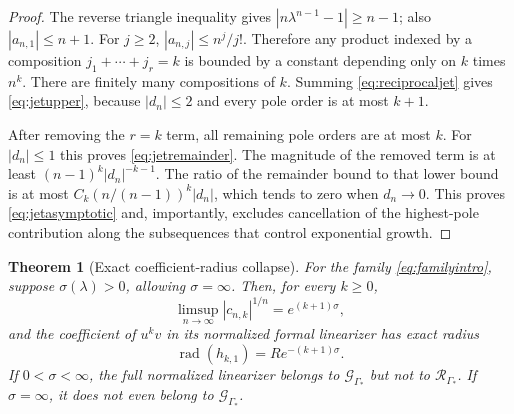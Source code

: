\documentclass[11pt,a4paper]{article}
\numberwithin{equation}{section}
\newtheorem{theorem}{Theorem}[section]
\theoremstyle{definition}
\theoremstyle{remark}
\newcommand{\GG}{\mathcal G}
\newcommand{\RR}{\mathcal R}
\newcommand{\rad}{\operatorname{rad}}
\newcommand{\Gstar}{\Gamma_*}
\begin{document}
\begin{proof}
The reverse triangle inequality gives
$|n\lambda^{n-1}-1|\ge n-1$; also $|a_{n,1}|\le n+1$.
For $j\ge2$, $|a_{n,j}|\le n^j/j!$. Therefore any product indexed by a
composition $j_1+\cdots+j_r=k$ is bounded by a constant depending only
on $k$ times $n^k$. There are finitely many compositions of $k$.
Summing \eqref{eq:reciprocaljet} gives \eqref{eq:jetupper}, because
$|d_n|\le2$ and every pole order is at most $k+1$.

After removing the $r=k$ term, all remaining pole orders are at most $k$.
For $|d_n|\le1$ this proves \eqref{eq:jetremainder}. The magnitude of
the removed term is at least $(n-1)^k|d_n|^{-k-1}$. The ratio of the
remainder bound to that lower bound is at most
$C_k(n/(n-1))^k|d_n|$, which tends to zero when $d_n\to0$.
This proves \eqref{eq:jetasymptotic} and, importantly, excludes cancellation
of the highest-pole contribution along the subsequences that control
exponential growth.
\end{proof}

\begin{theorem}[Exact coefficient-radius collapse]\label{thm:collapse}
For the family \eqref{eq:familyintro}, suppose
$\sigma(\lambda)>0$, allowing $\sigma=\infty$. Then, for every $k\ge0$,
\begin{equation}\label{eq:jetroot}
 \limsup_{n\to\infty}|c_{n,k}|^{1/n}=e^{(k+1)\sigma},
\end{equation}
and the coefficient of $u^kv$ in its normalized formal linearizer has
exact radius
\begin{equation}\label{eq:collapse}
 \rad(h_{k,1})=R e^{-(k+1)\sigma}.
\end{equation}
If $0<\sigma<\infty$, the full normalized linearizer belongs to
$\GG_{\Gstar}$ but not to $\RR_{\Gstar}$. If $\sigma=\infty$, it does
not even belong to $\GG_{\Gstar}$.
\end{theorem}
\end{document}
